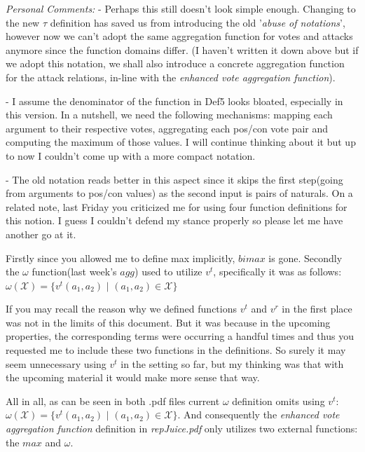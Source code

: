 \documentclass{article}
\begin{document}
{\color{teal}
 
\emph{Personal Comments:} 
-  Perhaps this still doesn't look simple enough. Changing to the new $\tau$ definition has saved us from introducing the old '\emph{abuse of notations}', however now we can't adopt the same aggregation function for votes and attacks anymore since the function domains differ. (I haven't written it down above but if we adopt this notation, we shall also introduce a concrete aggregation function for the attack relations, in-line with the \emph{enhanced vote aggregation function}).
\vspace{5 mm}

- I assume the denominator of the function in Def5 looks bloated, especially in this version. In a nutshell, we need the following mechanisms: mapping each argument to their respective votes, aggregating each pos/con vote pair  and computing the maximum of those values.  I will continue thinking about it but up to now I couldn't come up with a more compact notation.
\vspace{5 mm}

- The old notation reads better in this aspect since it skips the first step(going from arguments to pos/con values) as the second input is pairs of naturals. On a related note, last Friday you criticized me for using four function definitions for this notion. I guess I couldn't defend my stance properly so please let me have another go at it. 

Firstly since you allowed me to define max implicitly, $bimax$ is gone. Secondly the $\omega$ function(last week's $agg$) used to utilize $v^{t}$, specifically it was as follows: $\omega(\mathcal{X}) = \{v^t(a_1, a_2)$ $|$ $(a_1, a_2) \in \mathcal{X}\}$

If you may recall the reason why we defined functions $v^t$ and $v^r$ in the first place was not in the limits of this document. But it was because in the upcoming properties, the corresponding terms were occurring a handful times and thus you requested me to include these two functions in the definitions. So surely it may seem unnecessary using $v^t$ in the setting so far, but my thinking was that with the upcoming material it would make more sense that way.

All in all, as can be seen in both .pdf files current $\omega$ definition omits using $v^t$: $\omega(\mathcal{X}) = \{v^t(a_1, a_2)$ $|$ $(a_1, a_2) \in \mathcal{X}\}$. And consequently the \emph{enhanced vote aggregation function} definition in \emph{repJuice.pdf} only utilizes two external functions: the $max$ and $\omega$.

}
\end{document}
